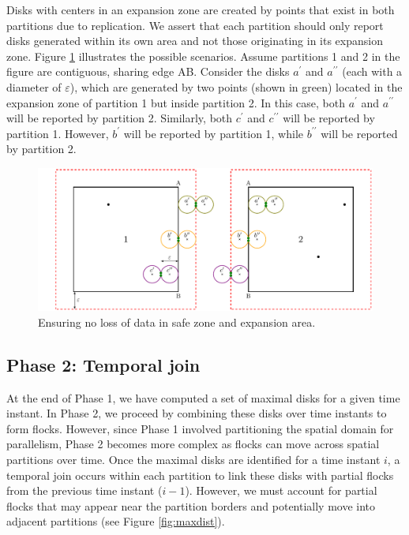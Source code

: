 Disks with centers in an expansion zone are created by points that exist in both partitions due to replication. We assert that each partition should only report 
disks generated within its own area and not those originating in its expansion zone. Figure \ref{fig:ensuring} illustrates the possible scenarios. Assume 
partitions 1 and 2 in the figure are contiguous, sharing edge AB. Consider the disks $a^\prime$ and $a^{\prime\prime}$ (each with a diameter of $\varepsilon$), 
which are generated by two points (shown in green) located in the expansion zone of partition 1 but inside partition 2. In this case, both $a^\prime$ and 
$a^{\prime\prime}$ will be reported by partition 2. Similarly, both $c^\prime$ and $c^{\prime\prime}$ will be reported by partition 1. However, $b^\prime$ will 
be reported by partition 1, while $b^{\prime\prime}$ will be reported by partition 2.

\begin{figure}
    \centering
    \includegraphics[width=\linewidth]{chapterPFlocks/figures/merge.pdf}
    \caption{Ensuring no loss of data in safe zone and expansion area.}\label{fig:ensuring}
\end{figure}

\subsection{Phase 2: Temporal join}\label{sec:temporal_join}
At the end of Phase 1, we have computed a set of maximal disks for a given time instant. In Phase 2, we proceed by combining these disks over time instants to 
form flocks. However, since Phase 1 involved partitioning the spatial domain for parallelism, Phase 2 becomes more complex as flocks can move across spatial 
partitions over time. Once the maximal disks are identified for a time instant $i$, a temporal join occurs within each partition to link these disks with 
partial flocks from the previous time instant ($i-1$). However, we must account for partial flocks that may appear near the partition borders and potentially 
move into adjacent partitions (see Figure \ref{fig:maxdist}).

